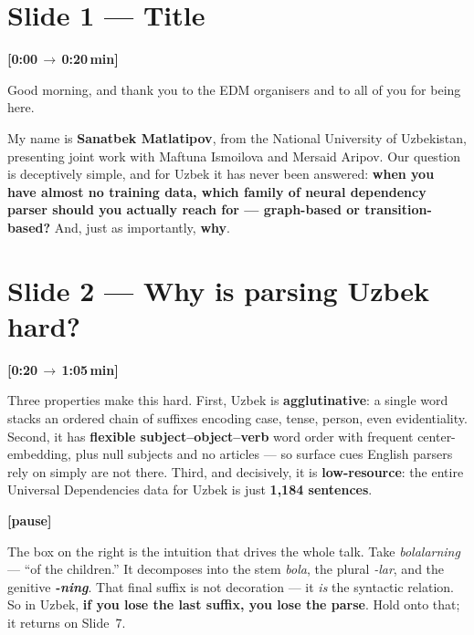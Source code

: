 \documentclass[12pt,a4paper]{article}
\newcommand{\timing}[2]{%
   \par\noindent\textbf{\small [#1\,$\to$\,#2\,min]}\par\vspace{0.2em}}
\newcommand{\say}[1]{\textbf{#1}}
\newcommand{\breathe}{\par\vspace{0.4em}\textbf{[pause]}\par}
\begin{document}
\newpage

\section*{Slide 1 --- Title}
\timing{0:00}{0:20}

Good morning, and thank you to the EDM organisers and to all of you for
being here.

My name is \say{Sanatbek Matlatipov}, from the National University of
Uzbekistan, presenting joint work with Maftuna Ismoilova and Mersaid
Aripov. Our question is deceptively simple, and for Uzbek it has never
been answered: \say{when you have almost no training data, which family
of neural dependency parser should you actually reach for --- graph-based
or transition-based?} And, just as importantly, \say{why}.

\section*{Slide 2 --- Why is parsing Uzbek hard?}
\timing{0:20}{1:05}

Three properties make this hard. First, Uzbek is \say{agglutinative}: a
single word stacks an ordered chain of suffixes encoding case, tense,
person, even evidentiality. Second, it has \say{flexible
subject--object--verb} word order with frequent center-embedding, plus
null subjects and no articles --- so surface cues English parsers rely on
simply are not there. Third, and decisively, it is \say{low-resource}:
the entire Universal Dependencies data for Uzbek is just \textbf{1,184
sentences}.

\breathe

The box on the right is the intuition that drives the whole talk. Take
\textit{bolalarning} --- ``of the children.'' It decomposes into the stem
\textit{bola}, the plural \textit{-lar}, and the genitive
\textbf{\textit{-ning}}. That final suffix is not decoration --- it
\emph{is} the syntactic relation. So in Uzbek, \say{if you lose the last
suffix, you lose the parse}. Hold onto that; it returns on Slide~7.

\end{document}
